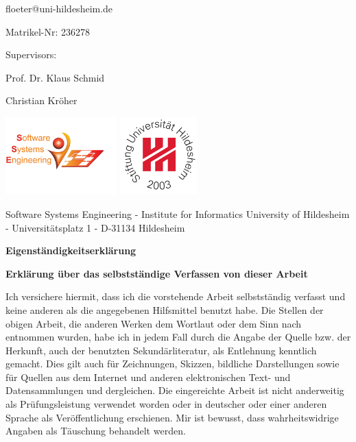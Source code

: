 \documentclass[a4paper]{article}
\newcommand\blankpage{%
    \null
    \thispagestyle{empty}%
    \addtocounter{page}{-1}%
    \newpage}
\begin{document}
\begin{center}
floeter@uni-hildesheim.de \par
Matrikel-Nr: 236278 \par
Supervisors: \par
Prof. Dr. Klaus Schmid \par
Christian Kr\"oher \par

\includegraphics[height=3cm,keepaspectratio]{template/logo-left.pdf} \hfill \includegraphics[height=3cm,keepaspectratio]{template/logo-right.pdf} \par
\hspace{8cm}

\scriptsize{Software Systems Engineering - Institute for Informatics University of Hildesheim - Universit\"atsplatz 1 - D-31134 Hildesheim}
\end{center}

\afterpage{\blankpage}

\newpage
\lhead{{}}
\rhead{\leftmark}
\pagestyle{fancy}





\Large \textbf{Eigenst\"andigkeitserkl\"arung} \normalsize


\textbf{Erkl\"arung \"uber das selbstst\"andige Verfassen von dieser Arbeit}

Ich versichere hiermit, dass ich die vorstehende Arbeit selbstständig verfasst und keine anderen als die angegebenen Hilfsmittel benutzt habe. Die Stellen der obigen Arbeit, die anderen Werken dem Wortlaut oder dem Sinn nach entnommen wurden, habe ich in jedem Fall durch die Angabe der Quelle bzw. der Herkunft, auch der benutzten Sekund\"arliteratur, als Entlehnung kenntlich gemacht. Dies gilt auch f\"ur Zeich\-nun\-gen, Skizzen, bildliche Dar\-stel\-lung\-en sowie f\"ur Quellen aus dem Internet und anderen elektronischen Text- und Datensammlungen und dergleichen. Die eingereichte Arbeit ist nicht anderweitig als Pr\"u\-fungs\-leis\-tung verwendet worden oder in deutscher oder einer anderen Spra\-che als Ver\-\"off\-ent\-lich\-ung erschienen. Mir ist bewusst, dass wahrheitswidrige Angaben als Täu\-schung behandelt werden.
\end{document}
